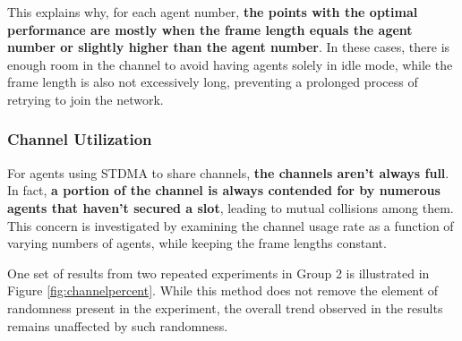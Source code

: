 This explains why, for each agent number, \textbf{the points with the optimal performance are mostly when the frame length equals the agent number or slightly higher than the agent number}. In these cases, there is enough room in the channel to avoid having agents solely in idle mode, while the frame length is also not excessively long, preventing a prolonged process of retrying to join the network.


\subsubsection{Channel Utilization}

For agents using STDMA to share channels, \textbf{the channels aren't always full}. In fact, \textbf{a portion of the channel is always contended for by numerous agents that haven't secured a slot}, leading to mutual collisions among them.
This concern is investigated by examining the channel usage rate as a function of varying numbers of agents, while keeping the frame lengths constant.

One set of results from two repeated experiments in Group 2 is illustrated in Figure \ref{fig:channelpercent}. While this method does not remove the element of randomness present in the experiment, the overall trend observed in the results remains unaffected by such randomness.

